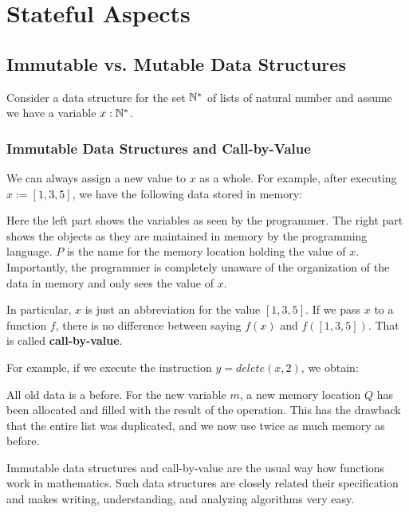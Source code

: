 \section{Stateful Aspects}

\subsection{Immutable vs. Mutable Data Structures}

Consider a data structure for the set $\mathbb{N}^*$ of lists of natural number and assume we have a variable $x:\mathbb{N}^*$.

\subsubsection{Immutable Data Structures and Call-by-Value}

We can always assign a new value to $x$ as a whole.
For example, after executing $x:=[1,3,5]$, we have the following data stored in memory:
\begin{amemory}
\alocations
{}
\end{amemory}
Here the left part shows the variables as seen by the programmer.
The right part shows the objects as they are maintained in memory by the programming language.
$P$ is the name for the memory location holding the value of $x$.
Importantly, the programmer is completely unaware of the organization of the data in memory and only sees the value of $x$.

In particular, $x$ is just an abbreviation for the value $[1,3,5]$.
If we pass $x$ to a function $f$, there is no difference between saying $f(x)$ and $f([1,3,5])$.
That is called \textbf{call-by-value}.

For example, if we execute the instruction $y = delete(x,2)$, we obtain:
\begin{amemory}
\alocations
{}
\end{amemory}
All old data is a before.
For the new variable $m$, a new memory location $Q$ has been allocated and filled with the result of the operation.
This has the drawback that the entire list was duplicated, and we now use twice as much memory as before.

Immutable data structures and call-by-value are the usual way how functions work in mathematics.
Such data structures are closely related their specification and makes writing, understanding, and analyzing algorithms very easy.

